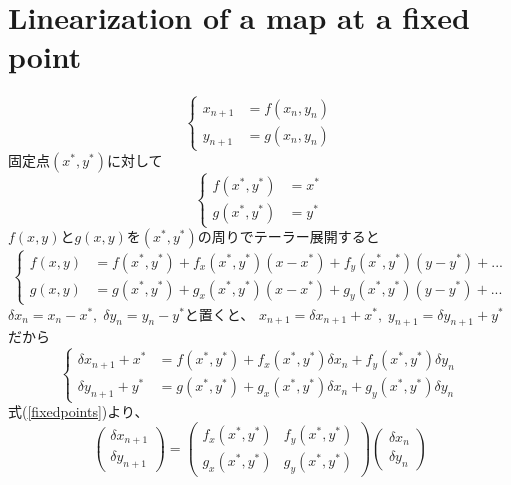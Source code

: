 \documentclass[]{jlreq}
\begin{document}
\section{Linearization of a map at a fixed point}
%
\begin{equation}
    \left\{
    \begin{aligned}
        x_{n+1} &= f(x_n, y_n) \\
        y_{n+1} &= g(x_n, y_n)
        \label{map1}
    \end{aligned}
    \right.
\end{equation}
%
固定点$(x^*,y^*)$に対して
%
\begin{equation}
    \left\{
    \begin{aligned}
        f(x^*, y^*) &= x^* \\
        g(x^*, y^*) &= y^*
        \label{fixedpoints}
    \end{aligned}
    \right.
\end{equation}
%
$f(x,y)$と$g(x,y)$を$(x^*,y^*)$の周りでテーラー展開すると
%
\begin{equation}
    \left\{
    \begin{aligned}
        f(x,y) &= f(x^*, y^*) +f_x(x^*,y^*)(x-x^*)+f_y(x^*,y^*)(y-y^*)+ ... \\
        g(x,y) &= g(x^*, y^*) +g_x(x^*,y^*)(x-x^*)+g_y(x^*,y^*)(y-y^*)+ ...
    \end{aligned}
    \right.
\end{equation}
%
$\delta x_n = x_n - x^*,\; \delta y_n = y_n - y^*$と置くと、
$x_{n+1} = \delta x_{n+1} + x^*,\; y_{n+1} = \delta y_{n+1}+y^*$だから
%
\begin{equation}
    \left\{
    \begin{aligned}
        \delta x_{n+1} + x^* &= f(x^*, y^*) +f_x(x^*,y^*)\delta x_n+f_y(x^*,y^*)\delta y_n \\
        \delta y_{n+1} + y^* &= g(x^*, y^*) +g_x(x^*,y^*)\delta x_n + g_y(x^*,y^*)\delta y_n
    \end{aligned}
    \right.
\end{equation}
%
式(\ref{fixedpoints})より、
%
\begin{equation}
    \begin{pmatrix}
        \delta x_{n+1}\\
        \delta y_{n+1}
    \end{pmatrix}
    =
    \begin{pmatrix}
        f_x(x^*,y^*) & f_y(x^*,y^*)\\
        g_x(x^*,y^*) & g_y(x^*,y^*)
    \end{pmatrix}
    \begin{pmatrix}
        \delta x_n \\
        \delta y_n
    \end{pmatrix}
\end{equation}
\end{document}
